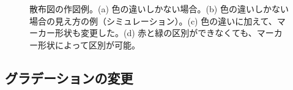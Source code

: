 \begin{figure}
{    \label{fig_color_marker2}%
  }
  \caption[散布図の作図例]{散布図の作図例。(a) 色の違いしかない場合。(b) 色の違いしかない場合の見え方の例（シミュレーション）。(c) 色の違いに加えて、マーカー形状も変更した。(d) 赤と緑の区別ができなくても、マーカー形状によって区別が可能。}
\end{figure}

\subsection{グラデーションの変更}

